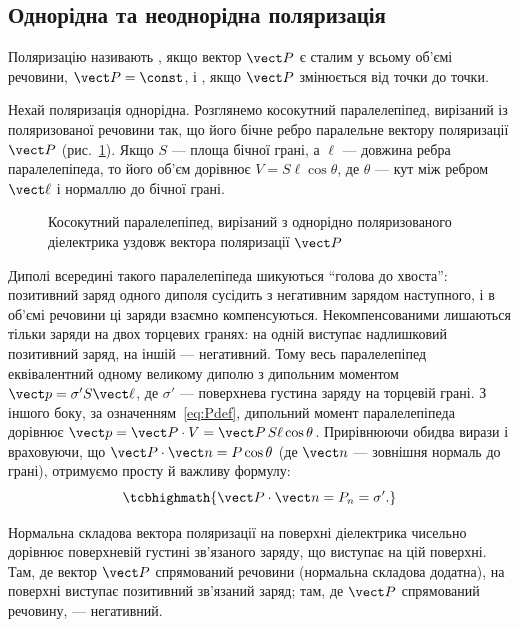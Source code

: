\subsection*{Однорідна та неоднорідна поляризація}

Поляризацію називають , якщо вектор $\vect P$ є сталим у всьому об'ємі речовини, $\vect P = \const$, і , якщо
$\vect P$ змінюється від точки до точки.

 Нехай поляризація однорідна. Розглянемо косокутний паралелепіпед, вирізаний із поляризованої речовини так, що його
бічне ребро паралельне вектору поляризації $\vect P$ (рис.~\ref{pic:PolarizedParallelepiped}). Якщо $S$ --- площа бічної грані, а $\ell$ --- довжина
ребра паралелепіпеда, то його об'єм дорівнює $V = S\ell\cos\theta$, де $\theta$ --- кут між ребром $\vect \ell$ і нормаллю до бічної грані.

\begin{figure}[h!]\centering
	\caption{Косокутний паралелепіпед, вирізаний з однорідно поляризованого діелектрика уздовж
		вектора поляризації $\vect P$\label{pic:PolarizedParallelepiped}}
\end{figure}

Диполі всередині такого паралелепіпеда шикуються \enquote{голова до хвоста}: позитивний заряд одного диполя сусідить з негативним зарядом наступного, і в
об'ємі речовини ці заряди взаємно компенсуються. Некомпенсованими лишаються тільки заряди на двох торцевих гранях: на одній виступає надлишковий
позитивний заряд, на іншій --- негативний. Тому весь паралелепіпед еквівалентний одному великому диполю з дипольним моментом $\vect p = \sigma' S
	\vect \ell$, де $\sigma'$ --- поверхнева густина  заряду на торцевій грані. З іншого боку, за
означенням~\eqref{eq:Pdef}, дипольний момент паралелепіпеда дорівнює $\vect p = \vect P \cdot V = \vect P \, S\ell\cos\theta$. Прирівнюючи обидва
вирази і враховуючи, що $\vect P \cdot \vect n = P\cos\theta$ (де $\vect n$ --- зовнішня нормаль до грані), отримуємо просту й важливу формулу:
\begin{equation}\label{eq:SigmaPrime}
	\tcbhighmath{
		\vect P \cdot \vect n = P_n = \sigma'.
	}
\end{equation}

\begin{Attention}
	Нормальна складова вектора поляризації на поверхні діелектрика чисельно дорівнює поверхневій густині зв'язаного заряду, що виступає на цій
	поверхні. Там, де вектор $\vect P$ спрямований  речовини (нормальна складова додатна), на поверхні виступає позитивний зв'язаний
	заряд; там, де $\vect P$ спрямований  речовину, --- негативний.
\end{Attention}

